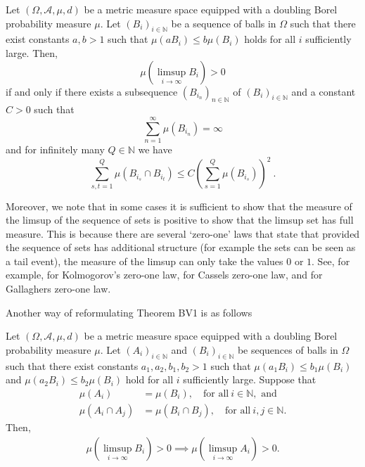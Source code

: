 \documentclass[12pt]{article}
\begin{document}
\begin{theoremSV*}
\label{3rd Velani result}
     Let $(\Omega, \mathscr{A}, \mu, d)$ be a metric measure space equipped with a doubling Borel probability measure $\mu$. Let $ (B_i)_{i \in \mathbb{N}} $ be a sequence of balls in $\Omega$ such that there exist constants $a,b>1 $ such that $\mu(aB_i) \leq b \mu(B_i) $ holds for all $i$ sufficiently large. Then,
     \[\mu\left(\limsup_{i \rightarrow \infty} B_i \right)>0\]
     if and only if there exists a subsequence $( B_{i_n} )_{n\in \mathbb{N}}$ of $( B_i )_{i\in \mathbb{N}}$ and a constant $C>0$ such that
      \[\sum_{n=1}^{\infty} \mu(B_{i_n})=\infty \]
      and for infinitely many $Q \in \mathbb{N}$ we have 
     \[ \sum_{s,t=1}^{Q} \mu(B_{i_s} \cap B_{i_t}) \leq C \left(\sum_{s=1}^{Q} \mu(B_{i_s})\right)^2 ~.\]
    
\end{theoremSV*}


     Moreover, we note that in some cases it is sufficient to show that the measure of the limsup of the sequence of sets is positive to show that the limsup set has full measure. This is because there are several `zero-one' laws that state that provided the sequence of sets has additional structure (for example the sets can be seen as a tail event), the measure of the limsup can only take the values $0$ or $1$. See, for example, \cite{billingsley1995probability} for Kolmogorov's zero-one law, \cite{cassels} for Cassels zero-one law, and \cite{Gallagher} for Gallaghers zero-one law. 
    
    Another way of reformulating Theorem BV1 is as follows

    \begin{corollary}\label{the corollary}
        Let $(\Omega, \mathscr{A}, \mu, d)$ be a metric measure space equipped with a doubling Borel probability measure $\mu$. Let $(A_i)_{i \in \mathbb{N}}$ and $ (B_i)_{i \in \mathbb{N}} $ be sequences of balls in $\Omega$ such that there exist constants $a_1,a_2,b_1,b_2>1 $ such that $\mu(a_1B_i) \leq b_1 \mu(B_i) $ and $\mu(a_2B_i) \leq b_2 \mu(B_i) $  hold for all $i$ sufficiently large.
        Suppose that
        \begin{equation}\label{measure equal in cor}
            \begin{split}
    \mu (A_i) &= \mu (B_i),  \quad  \text{for all}~ i \in \mathbb{N}, \text{ and} \\
     \mu (A_i \cap A_j) &= \mu (B_i \cap B_j),  \quad \text{for all} ~ i, j \in \mathbb{N}.
    \end{split}
        \end{equation}
        Then,
        \begin{align*}
            \mu \left( \limsup_{i\rightarrow \infty} B_i \right) >0 \implies \mu \left(\limsup_{i \rightarrow \infty}A_i \right)>0.
        \end{align*}
    \end{corollary}
\end{document}
